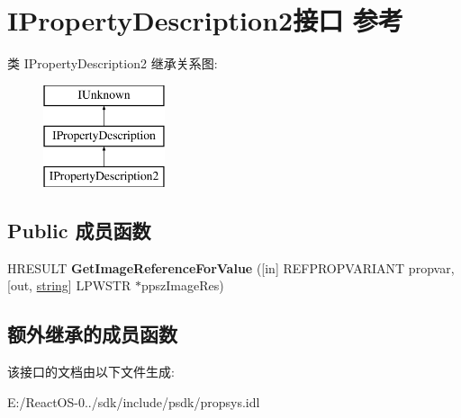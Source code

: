 \hypertarget{interface_i_property_description2}{}\section{I\+Property\+Description2接口 参考}
\label{interface_i_property_description2}
类 I\+Property\+Description2 继承关系图\+:\begin{figure}[H]
\begin{center}
\leavevmode
\includegraphics[height=3.000000cm]{interface_i_property_description2}
\end{center}
\end{figure}
\subsection*{Public 成员函数}
\begin{DoxyCompactItemize}
\item 
\mbox{\label{interface_i_property_description2_a9825f2f29b305d8d9c81cd21e05a692d}} 
H\+R\+E\+S\+U\+LT {\bfseries Get\+Image\+Reference\+For\+Value} (\mbox{[}in\mbox{]} R\+E\+F\+P\+R\+O\+P\+V\+A\+R\+I\+A\+NT propvar, \mbox{[}out, \hyperlink{structstring}{string}\mbox{]} L\+P\+W\+S\+TR $\ast$ppsz\+Image\+Res)
\end{DoxyCompactItemize}
\subsection*{额外继承的成员函数}


该接口的文档由以下文件生成\+:\begin{DoxyCompactItemize}
\item 
E\+:/\+React\+O\+S-\/0../sdk/include/psdk/propsys.\+idl\end{DoxyCompactItemize}
